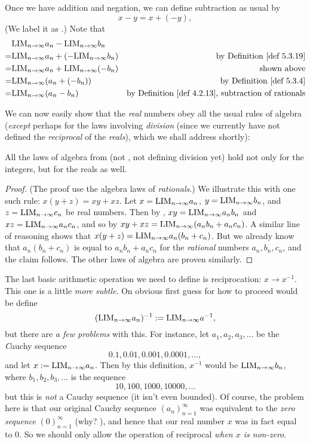 Once we have addition and negation, we can define subtraction as usual by
\[
    x - y = x + (-y),
\]
(We label it as .) Note that
\begin{align*}
      & \LIM_{n \toINF} a_n - \LIM_{n \toINF} b_n \\
    = & \LIM_{n \toINF} a_n + (-\LIM_{n \toINF} b_n) & \text{by \DEF{5.3.19}} \\
    = & \LIM_{n \toINF} a_n + \LIM_{n \toINF} (-b_n) & \text{shown above} \\
    = & \LIM_{n \toINF} (a_n + (-b_n)) & \text{by \DEF{5.3.4}} \\
    = & \LIM_{n \toINF} (a_n - b_n) & \text{by \DEF{4.2.13}, subtraction of rationals}
\end{align*}

We can now easily show that the \emph{real} numbers obey all the usual rules of algebra (\emph{except} perhaps for the laws involving \emph{division}
(since we currently have not defined the \emph{reciprocal} of the \emph{reals}), which we shall address shortly):

\begin{proposition} \label{prop 5.3.11}
All the laws of algebra from  (not , not defining division yet) hold not only for the integers, but for the reals as well.
\end{proposition}

\begin{proof}
(The proof use the algebra laws of \emph{rationals}.)
We illustrate this with one such rule: \(x(y + z) = xy + xz\).
Let \(x = \text{LIM}_{n \to \infty} a_n\), \(y = \text{LIM}_{n \to \infty} b_n\),
and \(z = \text{LIM}_{n \to \infty} c_n\) be real numbers.
Then by , \(xy = \text{LIM}_{n \to \infty} a_n b_n\) and \(xz = \text{LIM}_{n \to \infty} a_n c_n\),
and so by  \(xy + xz = \text{LIM}_{n \to \infty} (a_n b_n + a_n c_n)\).
A similar line of reasoning shows that \(x(y + z) = \text{LIM}_{n \to \infty} a_n (b_n + c_n)\).
But we already know that \(a_n (b_n + c_n)\) is equal to \(a_n b_n + a_n c_n\) for the \emph{rational} numbers \(a_n, b_n, c_n\), and the claim follows.
The other laws of algebra are proven similarly.
\end{proof}

The last basic arithmetic operation we need to define is reciprocation: \(x \to x^{-1}\).
This one is a little \emph{more subtle}.
On obvious first guess for how to proceed would be define
\[
    (\text{LIM}_{n \to \infty} a_n)^{-1} := \text{LIM}_{n \to \infty} a^{-1},
\]
but there are \emph{a few problems} with this.
For instance, let \(a_1, a_2, a_3,...\) be the \emph Cauchy sequence
\[
    0.1, 0.01, 0.001, 0.0001,...,
\]
and let \(x := \text{LIM}_{n \to \infty} a_n\).
Then by this definition, \(x^{-1}\) would be \(\text{LIM}_{n \to \infty} b_n\), where \(b_1, b_2, b_3,...\) is the sequence
\[
    10, 100, 1000, 10000,...
\]
but this is \emph{not} a Cauchy sequence (it isn't even bounded).
Of course, the problem here is that our original Cauchy sequence \((a_n)_{n = 1}^{\infty}\) was equivalent to the \emph{zero sequence} \((0)_{n = 1}^{\infty}\) (why? ),
and hence that our real number \(x\) was in fact equal to \(0\).
So we should only allow the operation of reciprocal \emph{when \(x\) is non-zero}.

